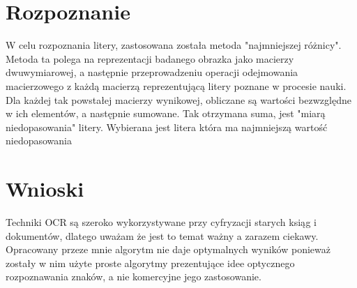\documentclass[a4paper, 12pt]{article}
\begin{document}
\section{Rozpoznanie}
W celu rozpoznania litery, zastosowana została metoda "najmniejszej różnicy". Metoda ta polega na reprezentacji badanego obrazka jako macierzy dwuwymiarowej, a następnie przeprowadzeniu operacji odejmowania macierzowego z każdą macierzą reprezentującą litery poznane w procesie nauki.
Dla każdej tak powstałej macierzy wynikowej, obliczane są wartości bezwzględne w ich elementów, a następnie sumowane.
Tak otrzymana suma, jest "miarą niedopasowania" litery.
Wybierana jest litera która ma najmniejszą wartość niedopasowania
\section{Wnioski}
Techniki OCR są szeroko wykorzystywane przy cyfryzacji starych ksiąg i dokumentów, dlatego uważam że jest to temat ważny a zarazem ciekawy.\\
Opracowany przeze mnie algorytm nie daje optymalnych wyników ponieważ zostały w nim użyte proste algorytmy prezentujące idee optycznego rozpoznawania znaków, a nie komercyjne jego zastosowanie.
\end{document}
